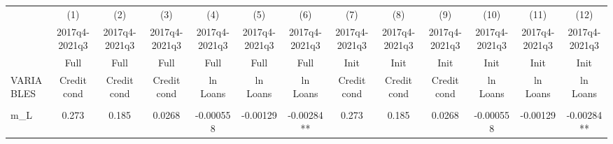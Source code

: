 \documentclass[]{article}
\begin{document}
\begin{center}
\begin{tabular}{lcccccccccccc} \hline
 & (1) & (2) & (3) & (4) & (5) & (6) & (7) & (8) & (9) & (10) & (11) & (12) \\
 & 2017q4-2021q3 & 2017q4-2021q3 & 2017q4-2021q3 & 2017q4-2021q3 & 2017q4-2021q3 & 2017q4-2021q3 & 2017q4-2021q3 & 2017q4-2021q3 & 2017q4-2021q3 & 2017q4-2021q3 & 2017q4-2021q3 & 2017q4-2021q3 \\
 & Full & Full & Full & Full & Full & Full & Init & Init & Init & Init & Init & Init \\
VARIABLES & Credit cond & Credit cond & Credit cond & ln Loans & ln Loans & ln Loans & Credit cond & Credit cond & Credit cond & ln Loans & ln Loans & ln Loans \\ \hline
\vspace{4pt} & \begin{footnotesize}\end{footnotesize} & \begin{footnotesize}\end{footnotesize} & \begin{footnotesize}\end{footnotesize} & \begin{footnotesize}\end{footnotesize} & \begin{footnotesize}\end{footnotesize} & \begin{footnotesize}\end{footnotesize} & \begin{footnotesize}\end{footnotesize} & \begin{footnotesize}\end{footnotesize} & \begin{footnotesize}\end{footnotesize} & \begin{footnotesize}\end{footnotesize} & \begin{footnotesize}\end{footnotesize} & \begin{footnotesize}\end{footnotesize} \\
m\_L & 0.273 & 0.185 & 0.0268 & -0.000558 & -0.00129 & -0.00284** & 0.273 & 0.185 & 0.0268 & -0.000558 & -0.00129 & -0.00284** \\

\end{tabular}
\end{center}
\end{document}
